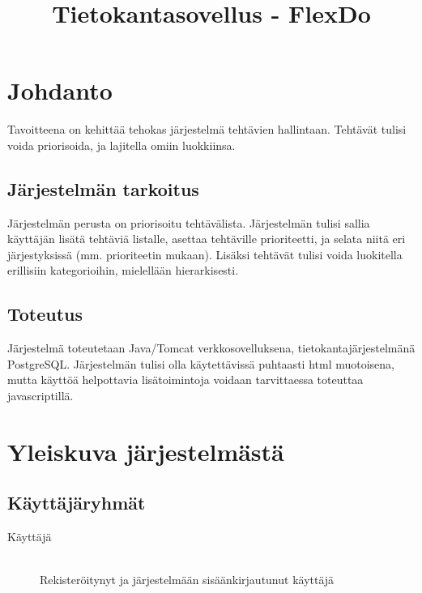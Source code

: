 ﻿\documentclass[finnish]{article}
\begin{document}
\title{Tietokantasovellus - FlexDo}
\maketitle


\section{Johdanto}
Tavoitteena on kehittää tehokas järjestelmä tehtävien hallintaan. Tehtävät tulisi voida priorisoida, ja lajitella omiin luokkiinsa.

\subsection{Järjestelmän tarkoitus}
Järjestelmän perusta on priorisoitu tehtävälista. Järjestelmän tulisi sallia käyttäjän lisätä tehtäviä listalle, asettaa tehtäville prioriteetti, ja selata niitä eri järjestyksissä (mm. prioriteetin mukaan). Lisäksi tehtävät tulisi voida luokitella erillisiin kategorioihin, mielellään hierarkisesti.

\subsection{Toteutus}
Järjestelmä toteutetaan Java/Tomcat verkkosovelluksena, tietokantajärjestelmänä PostgreSQL. Järjestelmän tulisi olla käytettävissä puhtaasti html muotoisena, mutta käyttöä helpottavia lisätoimintoja voidaan tarvittaessa toteuttaa javascriptillä.


\section{Yleiskuva järjestelmästä}

\subsection{Käyttäjäryhmät}
\begin{description}
  \item[Käyttäjä] \hfill \\
    Rekisteröitynyt ja järjestelmään sisäänkirjautunut käyttäjä
\end{description}
\end{document}
